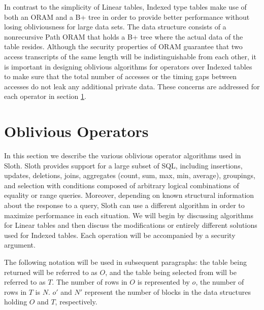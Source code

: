 \documentclass[USenglish,oneside,twocolumn]{article}
\def\name/{Sloth}
\begin{document}
In contrast to the simplicity of Linear tables, Indexed type tables make use of both an ORAM and a B+ tree in order to provide better performance without losing obliviousness for large data sets. The data structure consists of a nonrecursive Path ORAM that holds a B+ tree where the actual data of the table resides. Although the security properties of ORAM guarantee that two access transcripts of the same length will be indistinguishable from each other, it is important in designing oblivious algorithms for operators over Indexed tables to make sure that the total number of accesses or the timing gaps between accesses do not leak any additional private data. These concerns are addressed for each operator in section \ref{oblivOps}. 

\section{Oblivious Operators}\label{oblivOps}
In this section we describe the various oblivious operator algorithms used in \name/. \name/ provides support for a large subset of SQL, including insertions, updates, deletions, joins, aggregates (count, sum, max, min, average), groupings, and selection with conditions composed of arbitrary logical combinations of equality or range queries. Moreover, depending on known structural information about the response to a query, \name/ can use a different algorithm in order to maximize performance in each situation. We will begin by discussing algorithms for Linear tables and then discuss the modifications or entirely different solutions used for Indexed tables. Each operation will be accompanied by a security argument. 

The following notation will be used in subsequent paragraphs: the table being returned will be referred to as $O$, and the table being selected from will be referred to as $T$. The number of rows in $O$ is represented by $o$, the number of rows in $T$ is $N$. $o'$ and $N'$ represent the number of blocks in the data structures holding $O$ and $T$, respectively. 
\end{document}
